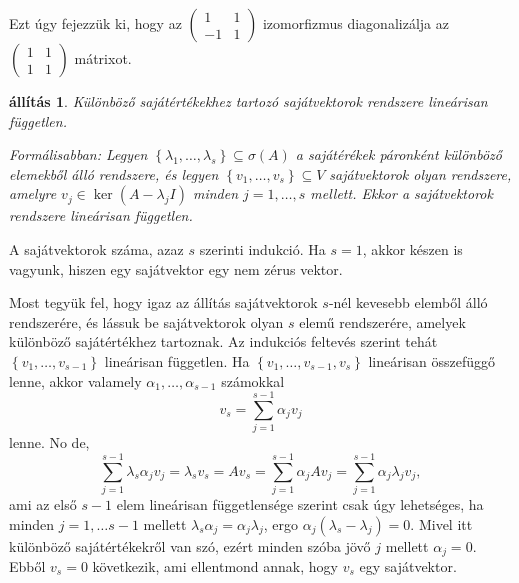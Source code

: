 \documentclass[9pt, a4paper, showtrims]{memoir}
\makeatletter
\renewenvironment{proof}[1][\proofname]
    {\par\pushQED{\qed}%
    \normalfont \topsep6\p@\@plus6\p@\relax
    \trivlist
    \item[\hskip\labelsep
        \itshape
    #1\@addpunct{:}]\ignorespaces}
    {\popQED\endtrivlist\@endpefalse}
\theoremstyle{plain}
\newtheorem{proposition}{állítás}[chapter]
\theoremstyle{remark}
\theoremstyle{definition}
\makeatother
\begin{document}
Ezt úgy fejezzük ki, hogy az
\begin{math}
	\begin{pmatrix}
		1  & 1 \\
		-1 & 1
	\end{pmatrix}
\end{math}
izomorfizmus diagonalizálja az
\begin{math}
	\begin{pmatrix}
		1 & 1 \\1&1
	\end{pmatrix}
\end{math}
mátrixot.
\begin{proposition}\label{pr:svlinfgtlen}
	Különböző sajátértékekhez tartozó sajátvektorok rendszere lineárisan független.

	Formálisabban:
	Legyen $\left\{ \lambda_1,\ldots,\lambda_s \right\}\subseteq \sigma\left( A \right)$
	a sajátérékek páronként különböző elemekből álló rendszere,
	és legyen $\left\{ v_1,\ldots,v_s \right\}\subseteq V$ sajátvektorok olyan rendszere,
	amelyre $v_j\in\ker\left( A-\lambda_jI \right)$ minden $j=1,\ldots,s$ mellett.
	Ekkor a sajátvektorok rendszere lineárisan független.
\end{proposition}
\begin{proof}
	A sajátvektorok száma, azaz $s$ szerinti indukció.
	Ha $s=1$, akkor készen is vagyunk,
	hiszen egy sajátvektor egy nem zérus vektor.

	Most tegyük fel, hogy igaz az állítás sajátvektorok $s$-nél kevesebb elemből álló rendszerére,
	és lássuk be sajátvektorok olyan $s$ elemű rendszerére, amelyek különböző sajátértékhez tartoznak.
	Az indukciós feltevés szerint tehát $\left\{ v_1,\ldots,v_{s-1} \right\}$ lineárisan független.
	Ha $\left\{ v_1,\ldots,v_{s-1},v_s \right\}$ lineárisan összefüggő lenne,
	akkor valamely $\alpha_1,\ldots,\alpha_{s-1}$ számokkal
	\[
		v_s=\sum_{j=1}^{s-1}\alpha_jv_j
	\]
	lenne.
	No de,
	\begin{equation*}
		\sum_{j=1}^{s-1}\lambda_s\alpha_jv_j
		=
		\lambda_sv_s
		=
		Av_s
		=
		\sum_{j=1}^{s-1}\alpha_jAv_j
		=
		\sum_{j=1}^{s-1}\alpha_j\lambda_jv_j,
	\end{equation*}
	ami az első $s-1$ elem lineárisan függetlensége szerint csak úgy lehetséges,
	ha minden $j=1,\dots s-1$ mellett
	\begin{math}
		\lambda_s\alpha_j
		=
		\alpha_j\lambda_j
	\end{math},
	ergo
	\begin{math}
		\alpha_j\left( \lambda_s-\lambda_j \right)
		=
		0.
	\end{math}
	Mivel itt különböző sajátértékekről van szó,
	ezért minden szóba jövő $j$ mellett $\alpha_j=0$.
	Ebből $v_s=0$ következik,
	ami ellentmond annak, hogy $v_s$ egy sajátvektor.
\end{proof}
\end{document}

